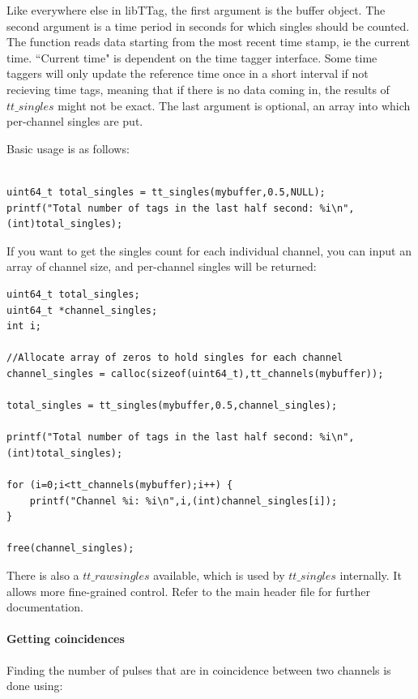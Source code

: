 \documentclass[10pt]{article}
\begin{document}
Like everywhere else in libTTag, the first argument is the buffer object. The second argument is a time period in seconds for which singles
should be counted. The function reads data starting from the most recent time stamp, ie the current time. ``Current time" is dependent on the time tagger interface.
Some time taggers will only update the reference time once in a short interval if not recieving time tags, meaning that if there is no data coming in,
the results of $tt\_singles$ might not be exact. The last argument is optional, an array into which per-channel singles are put.

Basic usage is as follows:

\begin{verbatim}

uint64_t total_singles = tt_singles(mybuffer,0.5,NULL);
printf("Total number of tags in the last half second: %i\n",(int)total_singles);

\end{verbatim}

If you want to get the singles count for each individual channel, you can input an array of channel size, and per-channel singles will be returned:

\begin{verbatim}
uint64_t total_singles;
uint64_t *channel_singles;
int i;

//Allocate array of zeros to hold singles for each channel
channel_singles = calloc(sizeof(uint64_t),tt_channels(mybuffer));

total_singles = tt_singles(mybuffer,0.5,channel_singles);

printf("Total number of tags in the last half second: %i\n",(int)total_singles);

for (i=0;i<tt_channels(mybuffer);i++) {
    printf("Channel %i: %i\n",i,(int)channel_singles[i]);
}

free(channel_singles);
\end{verbatim}

There is also a $tt\_rawsingles$ available, which is used by $tt\_singles$ internally. It allows more fine-grained control. Refer to the main header file for further documentation.

\paragraph{Getting coincidences} Finding the number of pulses that are in coincidence between two channels is done using:
\end{document}

